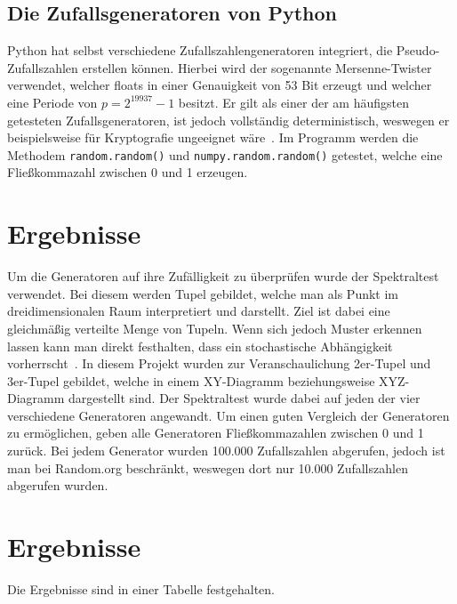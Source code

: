 \documentclass[12pt]{article}
\begin{document}
    \subsection{Die Zufallsgeneratoren von Python}\label{subsec:die-zufallsgeneratoren-von-python}
    Python hat selbst verschiedene Zufallszahlengeneratoren integriert, die Pseudo-Zufallszahlen erstellen können.
    Hierbei wird der sogenannte Mersenne-Twister verwendet, welcher floats in einer Genauigkeit von 53 Bit erzeugt und welcher
    eine Periode von $p=2^{19937}-1$ besitzt.
    Er gilt als einer der am häufigsten getesteten Zufallsgeneratoren, ist jedoch vollständig deterministisch,
    weswegen er beispielsweise für Kryptografie ungeeignet wäre~\cite{python-random,mersenne-twister}.
    Im Programm werden die Methodem \texttt{random.random()} und \texttt{numpy.random.random()} getestet,
    welche eine Fließkommazahl zwischen 0 und 1 erzeugen.


    \section{Ergebnisse}\label{sec:Ergebnisse}
    Um die Generatoren auf ihre Zufälligkeit zu überprüfen wurde der Spektraltest verwendet.
    Bei diesem werden Tupel gebildet, welche man als Punkt im dreidimensionalen Raum interpretiert und darstellt.
    Ziel ist dabei eine gleichmäßig verteilte Menge von Tupeln.
    Wenn sich jedoch Muster erkennen lassen kann man direkt festhalten, dass ein stochastische Abhängigkeit vorherrscht~\cite{spektraltest}.
    In diesem Projekt wurden zur Veranschaulichung 2er-Tupel und 3er-Tupel gebildet,
    welche in einem XY-Diagramm beziehungsweise XYZ-Diagramm dargestellt sind.
    Der Spektraltest wurde dabei auf jeden der vier verschiedene Generatoren angewandt.
    Um einen guten Vergleich der Generatoren zu ermöglichen, geben alle Generatoren Fließkommazahlen zwischen 0 und 1 zurück.
    Bei jedem Generator wurden 100.000 Zufallszahlen abgerufen, jedoch ist man bei Random.org beschränkt,
    weswegen dort nur 10.000 Zufallszahlen abgerufen wurden.

    \section{Ergebnisse}\label{sec:Ergebnisse}
    Die Ergebnisse sind in einer Tabelle festgehalten.

    \vfill
\end{document}
